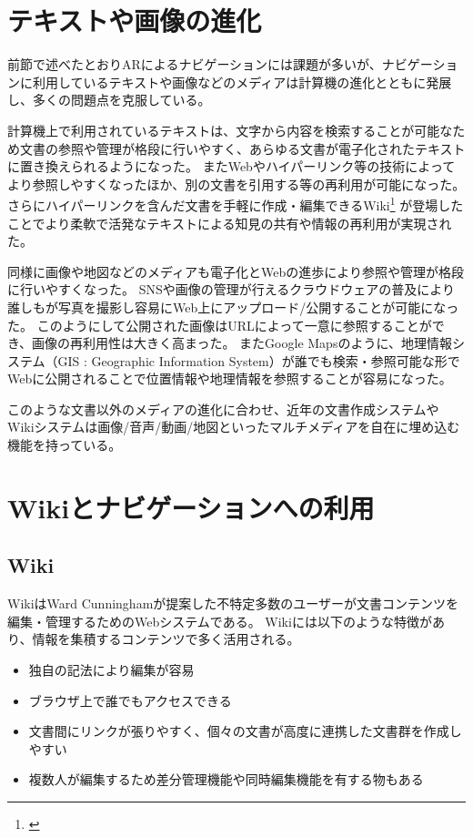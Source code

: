 \section{テキストや画像の進化}
前節で述べたとおりARによるナビゲーションには課題が多いが、ナビゲーションに利用しているテキストや画像などのメディアは計算機の進化とともに発展し、多くの問題点を克服している。

計算機上で利用されているテキストは、文字から内容を検索することが可能なため文書の参照や管理が格段に行いやすく、あらゆる文書が電子化されたテキストに置き換えられるようになった。
またWebやハイパーリンク等の技術によってより参照しやすくなったほか、別の文書を引用する等の再利用が可能になった。
さらにハイパーリンクを含んだ文書を手軽に作成・編集できるWiki\footnote{\textsf{}} が登場したことでより柔軟で活発なテキストによる知見の共有や情報の再利用が実現された。

同様に画像や地図などのメディアも電子化とWebの進歩により参照や管理が格段に行いやすくなった。
SNSや画像の管理が行えるクラウドウェアの普及により誰しもが写真を撮影し容易にWeb上にアップロード/公開することが可能になった。
このようにして公開された画像はURLによって一意に参照することができ、画像の再利用性は大きく高まった。
またGoogle Mapsのように、地理情報システム（GIS : Geographic Information System）が誰でも検索・参照可能な形でWebに公開されることで位置情報や地理情報を参照することが容易になった。

このような文書以外のメディアの進化に合わせ、近年の文書作成システムやWikiシステムは画像/音声/動画/地図といったマルチメディアを自在に埋め込む機能を持っている。

\section{Wikiとナビゲーションへの利用}
\subsection{Wiki}
WikiはWard Cunninghamが提案した不特定多数のユーザーが文書コンテンツを編集・管理するためのWebシステムである。
Wikiには以下のような特徴があり、情報を集積するコンテンツで多く活用される。
\begin{itemize}
  \item 独自の記法により編集が容易
  \item ブラウザ上で誰でもアクセスできる
  \item 文書間にリンクが張りやすく、個々の文書が高度に連携した文書群を作成しやすい
  \item 複数人が編集するため差分管理機能や同時編集機能を有する物もある
\end{itemize}

